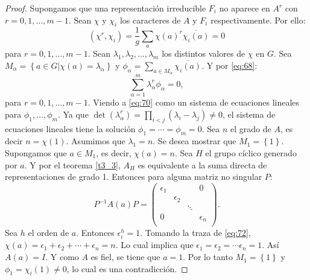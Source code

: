 \documentclass[12pt]{book}
\theoremstyle{definition}
\newcounter{in}
\begin{document}
\begin{proof}
  Supongamos que una representación irreducible $F_{i}$ no aparece en
  $A^{r}$ con $r=0,1,\ldots,m-1$. Sean $\chi$ y $\chi_{i}$ los
  caracteres de $A$ y $F_{i}$ respectivamente. Por ello:
  \begin{equation}
    \label{eq:68}
    (\chi^{r},\chi_{i}) = \frac{1}{g} \sum_{a} \chi(a)^{r} \overline{\chi_{i}(a)}=0
  \end{equation}
  para $r=0,1, \ldots, m-1$. Sean
  $\lambda_{1}, \lambda_{2}, \ldots, \lambda_{m}$ los distintos valores
  de $\chi$ en $G$. Sea
  $M_{\alpha}=\left\{ a \in G | \chi(a)=\lambda_{\alpha} \right\}$ y
  $\phi_{\alpha}= \sum_{a \in M_{\alpha}} \overline{\chi_{i}(a)}$. Y por \ref{eq:68}:
  \begin{equation}
    \label{eq:70}
    \sum_{\alpha=1}^{m} \lambda_{\alpha}^{r} \phi_{\alpha} =0,
  \end{equation}
  para $r=0,1, \ldots,m-1$. Viendo a \ref{eq:70} como un sistema de
  ecuaciones lineales para $\phi_{1}, \ldots, \phi_{m}$. Ya que
  $\det (\lambda_{\alpha}^{r}) = \prod_{i<j} (\lambda_{i}-\lambda_{j})
  \neq 0$, el sistema de ecuaciones lineales tiene la solución
  $\phi_{1}= \cdots= \phi_{m}=0$.  Sea $n$ el grado de $A$, es decir
  $n=\chi(1)$. Asumimos que $\lambda_{1}=n$. Se desea mostrar que
  $M_{1}=\left\{ 1 \right\}$. Supongamos que $a \in M_{1}$, es decir,
  $\chi(a)=n$. Sea $H$ el grupo cíclico generado por $a$. Y por el
  teorema \ref{t3_3}, $A_{H}$ es equivalente a la suma directa de
  representaciones de grado 1. Entonces para alguna matriz no singular
  $P$:
  \begin{equation}
    \label{eq:72}
    P^{-1}A(a)P=
    \begin{pmatrix}
      \epsilon_{1} & & & 0 \\ 
      & \epsilon_{2} & & \\
      & & \ddots & \\
      0 & & & \epsilon_{n}\\
    \end{pmatrix}
    .
  \end{equation}
  Sea $h$ el orden de $a$. Entonces $\epsilon_{i}^{h}=1$. Tomando la
  traza de \ref{eq:72},
  $\chi(a) = \epsilon_{1} + \epsilon_{2} + \cdots +
  \epsilon_{n}=n$. Lo cual implica que
  $\epsilon_{1}=\epsilon_{2}= \cdots \epsilon_{n}=1$. Así $A(a)=I$. Y
  como $A$ es fiel, se tiene que $a=1$. Por lo tanto
  $M_{1}=\left\{ 1 \right\}$ y $\phi_{1}= \chi_{i}(1) \neq 0$, lo cual
  es una contradicción.
\end{proof}
\end{document}
